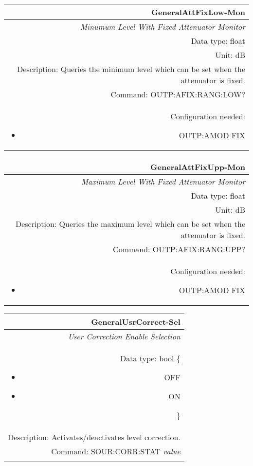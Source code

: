 \documentclass[openany]{article}
\begin{document}
		\begin{tabular}{N}
			\hline
			\bfseries GeneralAttFixLow-Mon \\ \hline
			\emph{Minumum Level With Fixed Attenuator Monitor} \\
			Data type: float \\
			Unit: dB \\
			Description: Queries the minimum level which can be set when the attenuator is fixed. \\
			Command: OUTP:AFIX:RANG:LOW? \\
			Configuration needed: \begin{itemize}[noitemsep]
				\small
				\item[] OUTP:AMOD FIX
			\end{itemize} \\

		\end{tabular}


		\begin{tabular}{N}
			\hline
			\bfseries GeneralAttFixUpp-Mon \\ \hline
			\emph{Maximum Level With Fixed Attenuator Monitor} \\
			Data type: float \\
			Unit: dB \\
			Description: Queries the maximum level which can be set when the attenuator is fixed. \\
			Command: OUTP:AFIX:RANG:UPP? \\
			Configuration needed: \begin{itemize}[noitemsep]
				\small
				\item[] OUTP:AMOD FIX
			\end{itemize} \\

		\end{tabular}


		\begin{tabular}{N}
			\hline
			\bfseries GeneralUsrCorrect-Sel \\ \hline
			\emph{User Correction Enable Selection} \\
			Data type: bool \{\begin{itemize}[noitemsep]
				\small
				\item[] OFF
				\item[] ON
			\end{itemize}\} \\
			Description: Activates/deactivates level correction. \\
			Command: SOUR:CORR:STAT \emph{value} \\
			\\ 

		\end{tabular}
\end{document}
